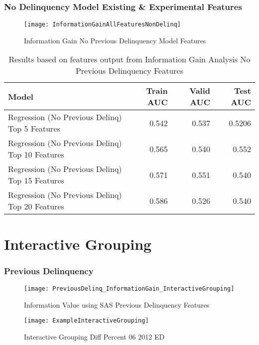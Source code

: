 \subsubsection{No Delinquency Model Existing \& Experimental Features}

\begin{figure}[H]
	\texttt{[image: InformationGainAllFeaturesNonDelinq]}
	\caption{Information Gain No Previous Delinquency Model Features}
	\label{fig:Information Gain No Previous Delinquency Model Features}
\end{figure}

\begin{table}[H]
	\centering
	\resizebox{\textwidth}{!}
	{
		\begin{tabular}{l | r | r| r}
			\hline
			\textbf{Model} & \textbf{Train AUC} & \textbf{Valid AUC} &  \textbf{Test AUC} \\
			\hline
			Regression (No Previous Delinq) Top 5 Features &  0.542 &  0.537 &  0.5206  \\
			Regression (No Previous Delinq) Top 10 Features &  0.565 &  0.540 &  0.552  \\			
			Regression (No Previous Delinq) Top 15 Features &  0.571 &  0.551 &  0.540  \\	
			Regression (No Previous Delinq) Top 20 Features &  0.586 &  0.526 &  0.540  \\		
						\hline
		\end{tabular}
	}
	\caption{Results based on features output from Information Gain Analysis No Previous Delinquency Features }
	\label{table:featureselection_base_model}
\end{table}

\section{Interactive Grouping}

\subsubsection{Previous Delinquency}
\begin{figure}[H]
	\texttt{[image: PreviousDelinq\_InformationGain\_InteractiveGrouping]}
	\caption{Information Value using SAS Previous Delinquency Features}
	\label{fig:Information Value using SAS Previous Delinquency Features}
\end{figure}

\begin{figure}[H]
	\texttt{[image: ExampleInteractiveGrouping]}
	\caption{Interactive Grouping Diff Percent 06 2012 ED}
	\label{fig:Interactive Grouping Diff Percent 06 2012 ED}
\end{figure}

